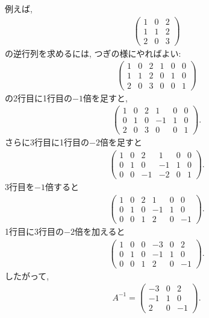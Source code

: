 例えば,
\begin{align*}
  \begin{pmatrix}
    1&0&2\\
    1&1&2\\
    2&0&3
  \end{pmatrix}
\end{align*}
の逆行列を求めるには, つぎの様にやればよい:
\begin{align*}
  \begin{pmatrix}
    1&0&2&1&0&0\\
    1&1&2&0&1&0\\
    2&0&3&0&0&1
  \end{pmatrix}
\end{align*}
の2行目に1行目の$-1$倍を足すと,
\begin{align*}
  \begin{pmatrix}
    1&0&2&1&0&0\\
    0&1&0&-1&1&0\\
    2&0&3&0&0&1
  \end{pmatrix}.
\end{align*}
さらに3行目に1行目の$-2$倍を足すと
\begin{align*}
  \begin{pmatrix}
    1&0&2&1&0&0\\
    0&1&0&-1&1&0\\
    0&0&-1&-2&0&1
  \end{pmatrix}.
\end{align*}
3行目を$-1$倍すると
\begin{align*}
  \begin{pmatrix}
    1&0&2&1&0&0\\
    0&1&0&-1&1&0\\
    0&0&1&2&0&-1
  \end{pmatrix}.
\end{align*}
1行目に3行目の$-2$倍を加えると
\begin{align*}
  \begin{pmatrix}
    1&0&0&-3&0&2\\
    0&1&0&-1&1&0\\
    0&0&1&2&0&-1
  \end{pmatrix}.
\end{align*}
したがって,
\begin{align*}
  A^{-1}=
  \begin{pmatrix}
    -3&0&2\\
    -1&1&0\\
    2&0&-1
  \end{pmatrix}.
\end{align*}
